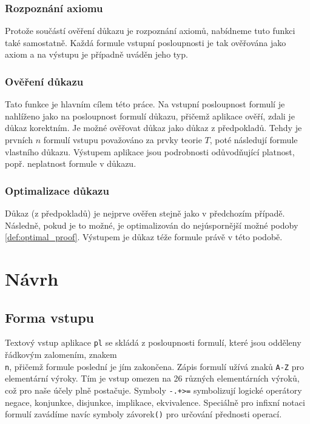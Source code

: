 \documentclass[thesis=B,czech,hidelinks]{thesis}[2012/06/26]
\begin{document}
\subsubsection{Rozpoznání axiomu}

Protože součástí ověření důkazu je rozpoznání axiomů, nabídneme tuto funkci také samostatně. Každá formule vstupní posloupnosti je tak ověřována jako axiom a na výstupu je případně uváděn jeho typ.

\subsubsection{Ověření důkazu}

Tato funkce je hlavním cílem této práce. Na vstupní posloupnost formulí je nahlíženo jako na posloupnost formulí důkazu, přičemž aplikace ověří, zdali je důkaz korektním. Je možné ověřovat důkaz jako důkaz z předpokladů. Tehdy je prvních $n$ formulí vstupu považováno za prvky teorie $T$, poté následují formule vlastního důkazu. Výstupem aplikace jsou podrobnosti odůvodňující platnost, popř. neplatnost formule v důkazu.

\subsubsection{Optimalizace důkazu}

Důkaz (z předpokladů) je nejprve ověřen stejně jako v předchozím případě. Následně, pokud je to možné, je optimalizován do nejúspornější možné podoby \ref{def:optimal_proof}. Výstupem je důkaz téže formule právě v této podobě.

\section{Návrh}

\subsection{Forma vstupu}

Textový vstup aplikace \texttt{pl} se skládá z posloupnosti formulí, které jsou odděleny řádkovým zalomením, znakem \texttt{\\n}, přičemž formule poslední je jím zakončena. Zápis formulí užívá znaků \texttt{A-Z} pro elementární výroky. Tím je vstup omezen na 26 různých elementárních výroků, což pro naše účely plně postačuje. Symboly \texttt{-.+>=} symbolizují logické operátory negace, konjunkce, disjunkce, implikace, ekvivalence. Speciálně pro infixní notaci formulí zavádíme navíc symboly závorek\texttt{()} pro určování přednosti operací.
\end{document}
